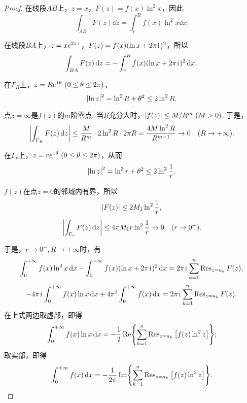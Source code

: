 \begin{theorem}
\begin{proof}
在线段\(AB\)上，\(z=x\)，\(F(z) = f(x) \ln^2 x\)，因此\[
\int_{AB} F(z) \dd{z}
= \int_r^R f(x) \ln^2 x \dd{x}.
\]

在线段\(BA\)上，\(z = x e^{2\pi\kern1pt\mathrm{i}\kern1pt}\)，\(F(z) = f(x) (\ln x + 2\pi\kern1pt\mathrm{i}\kern1pt)^2\)，所以\[
\int_{BA} F(z) \dd{z}
= -\int_r^R f(x) (\ln x + 2\pi\kern1pt\mathrm{i}\kern1pt)^2 \dd{x}.
\]

在\(\Gamma_R\)上，\(z = R e^{\iu\theta}\ (0\leq\theta\leq2\pi)\)，\[
\abs{\ln z}^2 = \ln^2 R + \theta^2 \leq 2 \ln^2 R.
\]

点\(z=\infty\)是\(f(z)\)的\(m\)阶零点.
当\(R\)充分大时，\(\abs{f(z)} \leq M/R^m\ (M>0)\).
于是，\[
\abs{\int_{\Gamma_R} F(z) \dd{z}}
\leq \frac{M}{R^m} \cdot 2 \ln^2 R \cdot 2\pi R
= \frac{4M \ln^2 R}{R^{m-1}} \to 0 \quad(R\to+\infty).
\]

在\(\Gamma_r\)上，\(z = r e^{\iu\theta}\ (0\leq\theta\leq2\pi)\)，从而\[
\abs{\ln z}^2 = \ln^2 r + \theta^2
\leq 2 \ln^2 \frac{1}{r}.
\]

\(f(z)\)在点\(z=0\)的邻域内有界，所以\[
\abs{F(z)} \leq 2M_1 \ln^2 \frac{1}{r},
\]\[
\abs{\int_{\Gamma_r} F(z) \dd{z}}
\leq 4\pi M_1 r \ln^2 \frac{1}{r}
\to 0 \quad(r\to0^+).
\]

于是，\(r\to0^+, R\to+\infty\)时，有\[
\int_0^{+\infty} f(x) \ln^2 x \dd{x}
- \int_0^{+\infty} f(x) (\ln x + 2\pi\kern1pt\mathrm{i}\kern1pt)^2 \dd{x}
= 2\pi\kern1pt\mathrm{i}\kern1pt \sum_{k=1}^n \operatorname{Res}_{z=a_k} F(z),
\]\[
-4\pi\kern1pt\mathrm{i}\kern1pt \int_0^{+\infty} f(x) \ln x \dd{x}
+ 4\pi^2 \int_0^{+\infty} f(x) \dd{x}
= 2\pi\kern1pt\mathrm{i}\kern1pt \sum_{k=1}^n \operatorname{Res}_{z=a_k} F(z).
\]
在上式两边取虚部，即得\begin{equation}\label{equation:留数定理.利用留数定理计算实积分4.2}
\int_0^{+\infty} f(x) \ln x \dd{x}
= -\frac{1}{2} \Re{ \sum_{k=1}^n \operatorname{Res}_{z=a_k} \left[ f(z) \ln^2 z \right] };
\end{equation}
取实部，即得\begin{equation}\label{equation:留数定理.利用留数定理计算实积分4.3}
\int_0^{+\infty} f(x) \dd{x}
= -\frac{1}{2\pi} \Im{ \sum_{k=1}^n \operatorname{Res}_{z=a_k} \left[ f(z) \ln^2 z \right] }.
\end{equation}
\end{proof}
\end{theorem}

